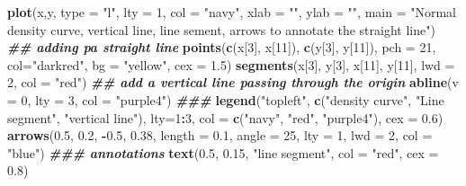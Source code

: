 \documentclass[
]{book}
\newenvironment{Shaded}{\begin{snugshade}}{\end{snugshade}}
\newcommand{\AttributeTok}[1]{\textcolor[rgb]{0.13,0.29,0.53}{#1}}
\newcommand{\DecValTok}[1]{\textcolor[rgb]{0.00,0.00,0.81}{#1}}
\newcommand{\DocumentationTok}[1]{\textcolor[rgb]{0.56,0.35,0.01}{\textbf{\textit{#1}}}}
\newcommand{\FloatTok}[1]{\textcolor[rgb]{0.00,0.00,0.81}{#1}}
\newcommand{\FunctionTok}[1]{\textcolor[rgb]{0.13,0.29,0.53}{\textbf{#1}}}
\newcommand{\NormalTok}[1]{#1}
\newcommand{\SpecialCharTok}[1]{\textcolor[rgb]{0.81,0.36,0.00}{\textbf{#1}}}
\newcommand{\StringTok}[1]{\textcolor[rgb]{0.31,0.60,0.02}{#1}}
\begin{document}
\begin{Shaded}
\begin{Highlighting}[]
\FunctionTok{plot}\NormalTok{(x,y, }\AttributeTok{type =} \StringTok{"l"}\NormalTok{, }\AttributeTok{lty =} \DecValTok{1}\NormalTok{, }\AttributeTok{col =} \StringTok{"navy"}\NormalTok{, }\AttributeTok{xlab =} \StringTok{""}\NormalTok{, }\AttributeTok{ylab =} \StringTok{""}\NormalTok{,}
     \AttributeTok{main =} \StringTok{"Normal density curve, vertical line, line sement, arrows to annotate the straight line"}\NormalTok{)}
\DocumentationTok{\#\# adding pa straight line}
\FunctionTok{points}\NormalTok{(}\FunctionTok{c}\NormalTok{(x[}\DecValTok{3}\NormalTok{], x[}\DecValTok{11}\NormalTok{]), }\FunctionTok{c}\NormalTok{(y[}\DecValTok{3}\NormalTok{], y[}\DecValTok{11}\NormalTok{]), }\AttributeTok{pch =} \DecValTok{21}\NormalTok{, }\AttributeTok{col=}\StringTok{"darkred"}\NormalTok{, }\AttributeTok{bg =} \StringTok{"yellow"}\NormalTok{,}
       \AttributeTok{cex =} \FloatTok{1.5}\NormalTok{)}
\FunctionTok{segments}\NormalTok{(x[}\DecValTok{3}\NormalTok{], y[}\DecValTok{3}\NormalTok{], x[}\DecValTok{11}\NormalTok{], y[}\DecValTok{11}\NormalTok{], }\AttributeTok{lwd =} \DecValTok{2}\NormalTok{, }\AttributeTok{col =} \StringTok{"red"}\NormalTok{)}
\DocumentationTok{\#\# add a vertical line passing through the origin}
\FunctionTok{abline}\NormalTok{(}\AttributeTok{v =} \DecValTok{0}\NormalTok{, }\AttributeTok{lty =} \DecValTok{3}\NormalTok{, }\AttributeTok{col =} \StringTok{"purple4"}\NormalTok{)}
\DocumentationTok{\#\#\#}
\FunctionTok{legend}\NormalTok{(}\StringTok{"topleft"}\NormalTok{, }\FunctionTok{c}\NormalTok{(}\StringTok{"density curve"}\NormalTok{, }\StringTok{"Line segment"}\NormalTok{, }\StringTok{"vertical line"}\NormalTok{), }\AttributeTok{lty=}\DecValTok{1}\SpecialCharTok{:}\DecValTok{3}\NormalTok{, }
       \AttributeTok{col =} \FunctionTok{c}\NormalTok{(}\StringTok{"navy"}\NormalTok{, }\StringTok{"red"}\NormalTok{, }\StringTok{"purple4"}\NormalTok{), }\AttributeTok{cex =} \FloatTok{0.6}\NormalTok{)  }
\FunctionTok{arrows}\NormalTok{(}\FloatTok{0.5}\NormalTok{, }\FloatTok{0.2}\NormalTok{, }\SpecialCharTok{{-}}\FloatTok{0.5}\NormalTok{, }\FloatTok{0.38}\NormalTok{,  }\AttributeTok{length =} \FloatTok{0.1}\NormalTok{, }\AttributeTok{angle =} \DecValTok{25}\NormalTok{, }\AttributeTok{lty =} \DecValTok{1}\NormalTok{, }\AttributeTok{lwd =} \DecValTok{2}\NormalTok{, }
       \AttributeTok{col =} \StringTok{"blue"}\NormalTok{)}
\DocumentationTok{\#\#\# annotations}
\FunctionTok{text}\NormalTok{(}\FloatTok{0.5}\NormalTok{, }\FloatTok{0.15}\NormalTok{, }\StringTok{"line segment"}\NormalTok{, }\AttributeTok{col =} \StringTok{"red"}\NormalTok{, }\AttributeTok{cex =} \FloatTok{0.8}\NormalTok{)}
\end{Highlighting}
\end{Shaded}
\end{document}
